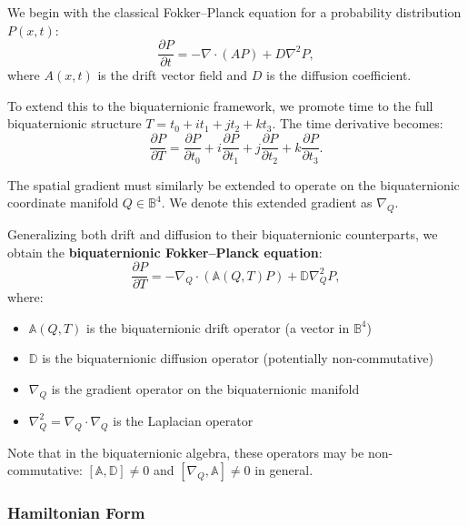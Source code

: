We begin with the classical Fokker--Planck equation for a probability distribution $P(x,t)$:
\begin{equation}
\frac{\partial P}{\partial t} = - \nabla \cdot (A P) + D \nabla^2 P,
\label{eq:classical_fokker_planck}
\end{equation}
where $A(x,t)$ is the drift vector field and $D$ is the diffusion coefficient.

To extend this to the biquaternionic framework, we promote time to the full biquaternionic structure $T = t_0 + i t_1 + j t_2 + k t_3$. The time derivative becomes:
\begin{equation}
\frac{\partial P}{\partial T} =
\frac{\partial P}{\partial t_0}
+ i\frac{\partial P}{\partial t_1}
+ j\frac{\partial P}{\partial t_2}
+ k\frac{\partial P}{\partial t_3}.
\label{eq:biquaternionic_time_derivative}
\end{equation}

The spatial gradient must similarly be extended to operate on the biquaternionic coordinate manifold $Q \in \mathbb{B}^4$. We denote this extended gradient as $\nabla_Q$.

Generalizing both drift and diffusion to their biquaternionic counterparts, we obtain the \textbf{biquaternionic Fokker--Planck equation}:
\begin{equation}
\frac{\partial P}{\partial T}
= - \nabla_Q \cdot
\left( \mathbb{A}(Q,T) P \right)
+ \mathbb{D} \nabla_Q^2 P,
\label{eq:biquaternionic_fokker_planck}
\end{equation}
where:
\begin{itemize}
\item $\mathbb{A}(Q,T)$ is the biquaternionic drift operator (a vector in $\mathbb{B}^4$)
\item $\mathbb{D}$ is the biquaternionic diffusion operator (potentially non-commutative)
\item $\nabla_Q$ is the gradient operator on the biquaternionic manifold
\item $\nabla_Q^2 = \nabla_Q \cdot \nabla_Q$ is the Laplacian operator
\end{itemize}

Note that in the biquaternionic algebra, these operators may be non-commutative: $[\mathbb{A}, \mathbb{D}] \neq 0$ and $[\nabla_Q, \mathbb{A}] \neq 0$ in general.

\subsubsection{Hamiltonian Form}

